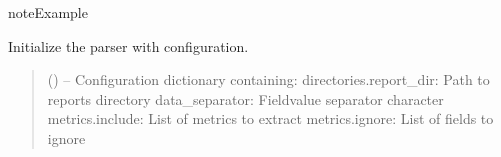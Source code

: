 \documentclass[a4paper,11pt,english,openany,oneside]{sphinxmanual}
\begin{document}
\begin{fulllineitems}
\begin{fulllineitems}
\begin{quote}
\begin{description}
\end{description}\end{quote}

\end{fulllineitems}


\begin{sphinxadmonition}{note}{Example}

\begin{sphinxVerbatim}[commandchars=\\\{\}]
  
 
      
      
\end{sphinxVerbatim}
\end{sphinxadmonition}

\begin{fulllineitems}
\label{\detokenize{modules/core:core.analysis.SmartFileParser.__init__}}
\pysigstartsignatures
\pysiglinewithargsret
{}
{}
{}
\pysigstopsignatures
\sphinxAtStartPar
Initialize the parser with configuration.
\begin{quote}\begin{description}
\sphinxAtStartPar
{} () – Configuration dictionary containing:
\sphinxhyphen{} directories.report\_dir: Path to reports directory
\sphinxhyphen{} data\_separator: Field\sphinxhyphen{}value separator character
\sphinxhyphen{} metrics.include: List of metrics to extract
\sphinxhyphen{} metrics.ignore: List of fields to ignore

\end{description}\end{quote}


\end{fulllineitems}
\end{fulllineitems}
\end{document}

